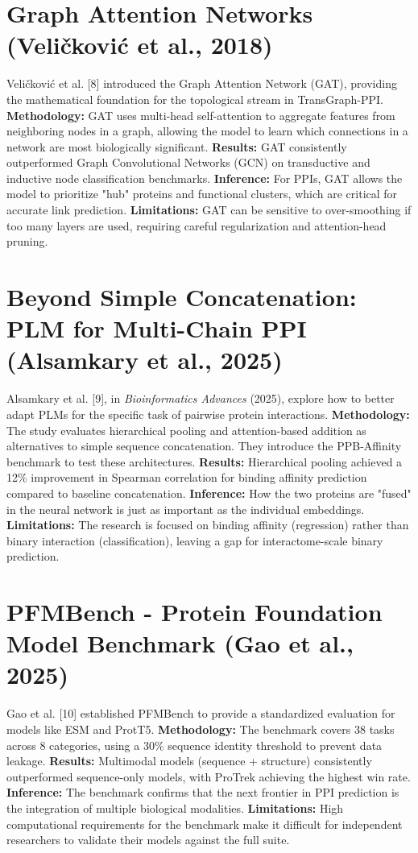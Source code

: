 \documentclass[12pt,a4paper]{report}
\begin{document}
\section{Graph Attention Networks (Veli\v{c}kovi\'{c} et al., 2018)}
Veli\v{c}kovi\'{c} et al. [8] introduced the Graph Attention Network (GAT), providing the mathematical foundation for the topological stream in TransGraph-PPI.
\textbf{Methodology:} GAT uses multi-head self-attention to aggregate features from neighboring nodes in a graph, allowing the model to learn which connections in a network are most biologically significant.
\textbf{Results:} GAT consistently outperformed Graph Convolutional Networks (GCN) on transductive and inductive node classification benchmarks.
\textbf{Inference:} For PPIs, GAT allows the model to prioritize "hub" proteins and functional clusters, which are critical for accurate link prediction.
\textbf{Limitations:} GAT can be sensitive to over-smoothing if too many layers are used, requiring careful regularization and attention-head pruning.

\section{Beyond Simple Concatenation: PLM for Multi-Chain PPI (Alsamkary et al., 2025)}
Alsamkary et al. [9], in \textit{Bioinformatics Advances} (2025), explore how to better adapt PLMs for the specific task of pairwise protein interactions.
\textbf{Methodology:} The study evaluates hierarchical pooling and attention-based addition as alternatives to simple sequence concatenation. They introduce the PPB-Affinity benchmark to test these architectures.
\textbf{Results:} Hierarchical pooling achieved a 12\% improvement in Spearman correlation for binding affinity prediction compared to baseline concatenation.
\textbf{Inference:} How the two proteins are "fused" in the neural network is just as important as the individual embeddings.
\textbf{Limitations:} The research is focused on binding affinity (regression) rather than binary interaction (classification), leaving a gap for interactome-scale binary prediction.

\section{PFMBench - Protein Foundation Model Benchmark (Gao et al., 2025)}
Gao et al. [10] established PFMBench to provide a standardized evaluation for models like ESM and ProtT5.
\textbf{Methodology:} The benchmark covers 38 tasks across 8 categories, using a 30\% sequence identity threshold to prevent data leakage.
\textbf{Results:} Multimodal models (sequence + structure) consistently outperformed sequence-only models, with ProTrek achieving the highest win rate.
\textbf{Inference:} The benchmark confirms that the next frontier in PPI prediction is the integration of multiple biological modalities.
\textbf{Limitations:} High computational requirements for the benchmark make it difficult for independent researchers to validate their models against the full suite.
\end{document}
